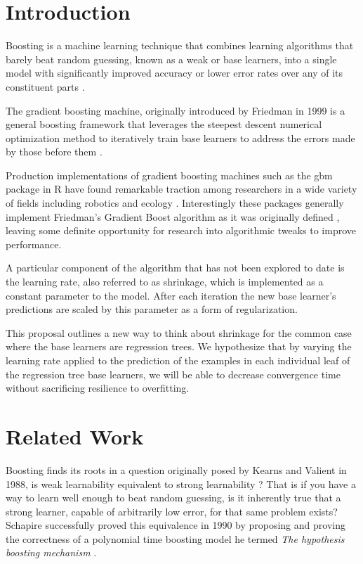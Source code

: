 \documentclass[conference]{IEEEtran}
\begin{document}
\section{Introduction}

Boosting is a machine learning technique that combines learning algorithms that barely beat random guessing, known as a weak or base learners, into a single model with significantly improved accuracy or lower error rates over any of its constituent parts \cite{StrengthOfWeak}  \cite{BoostingSurvey}. 

The gradient boosting machine, originally introduced by Friedman in 1999 is a general boosting framework that leverages the steepest descent numerical optimization method to iteratively train base learners to address the errors made by those before them \cite{2001Friedman}.

Production implementations of gradient boosting machines such as the gbm package in R have found remarkable traction among researchers in a wide variety of fields including robotics and ecology \cite{GBMTut} \cite{ecological}. Interestingly these packages generally implement Friedman's Gradient Boost algorithm as it was originally defined \cite{2012ridgeway}, leaving some definite opportunity for research into algorithmic tweaks to improve performance. 

A particular component of the algorithm that has not been explored to date is the learning rate, also referred to as shrinkage, which is implemented as a constant parameter to the model. After each iteration the new base learner's predictions are scaled by this parameter as a form of regularization. 

This proposal outlines a new way to think about shrinkage for the common case where the base learners are regression trees. We hypothesize that by varying the learning rate applied to the prediction of the examples in each individual leaf of the regression tree base learners, we will be able to decrease convergence time without sacrificing resilience to overfitting. 

\section{Related Work}
Boosting finds its roots in a question originally posed by Kearns and Valient in 1988, is weak learnability equivalent to strong learnability\cite{Kearns:1988} \cite{KearnsValient:1989}? That is if you have a way to learn well enough to beat random guessing, is it inherently true that a strong learner, capable of arbitrarily low error, for that same problem exists? Schapire successfully proved this equivalence in 1990 by proposing and proving the correctness of a polynomial time boosting model he termed \textit{The hypothesis boosting mechanism} \cite{StrengthOfWeak}. 
\end{document}
